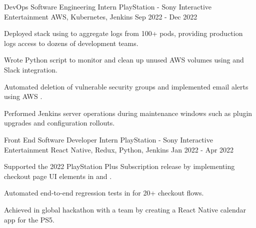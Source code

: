 

\begin{cventries}

  \cventry
    {DevOps Software Engineering Intern} %
    {PlayStation - Sony Interactive Entertainment} %
    {AWS, Kubernetes, Jenkins} %
    {Sep 2022 - Dec 2022} %
    {
      \begin{cvitems} %
        \item {Deployed  stack using  to aggregate logs from 100+  pods, providing production logs access to dozens of development teams.}
        \item {Wrote Python script to monitor and clean up unused AWS volumes using  and Slack integration.}
        \item {Automated deletion of vulnerable security groups and implemented email alerts using AWS .}
        \item {Performed  Jenkins server operations during maintenance windows such as plugin upgrades and configuration rollouts.}
      \end{cvitems}
    }

  \cventry
    {Front End Software Developer Intern} %
    {PlayStation - Sony Interactive Entertainment} %
    {React Native, Redux, Python, Jenkins} %
    {Jan 2022 - Apr 2022} %
    {
      \begin{cvitems} %
        \item {Supported the 2022 PlayStation Plus Subscription release by implementing checkout page UI elements in  and .}
        \item {Automated end-to-end regression tests in  for 20+ checkout flows.} 
        \item {Achieved  in global hackathon with a team by creating a React Native calendar app for the PS5.}
      \end{cvitems}
    }


\end{cventries}
